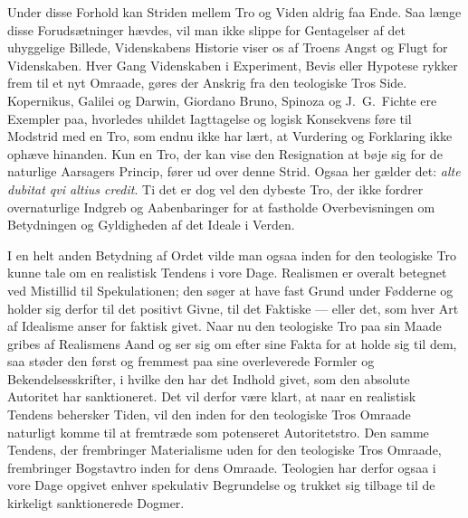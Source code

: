 \documentclass[12pt,a4paper]{article}
\begin{document}
Under disse Forhold kan Striden mellem Tro og Viden aldrig faa Ende.
Saa længe disse Forudsætninger hævdes, vil man ikke slippe for
Gentagelser af det uhyggelige Billede, Videnskabens Historie viser os af
Troens Angst og Flugt for Videnskaben. Hver Gang Videnskaben i
Experiment, Bevis eller Hypotese rykker frem til et nyt Omraade, gøres
der Anskrig fra den teologiske Tros Side. Kopernikus, Galilei og Darwin,
Giordano Bruno, Spinoza og J.\ G.\ Fichte ere Exempler paa, hvorledes
uhildet Iagttagelse og logisk Konsekvens føre til Modstrid med en Tro,
som endnu ikke har lært, at Vurdering og Forklaring ikke ophæve
hinanden. Kun en Tro, der kan vise den Resignation at bøje sig for de
naturlige Aarsagers Princip, fører ud over denne Strid. Ogsaa her
gælder det: \textit{alte dubitat qvi altius credit}. Ti det er dog vel
den dybeste Tro, der ikke fordrer overnaturlige Indgreb og Aabenbaringer
for at fastholde Overbevisningen om Betydningen og Gyldigheden af det
Ideale i Verden.

I en helt anden Betydning af Ordet vilde man ogsaa inden for den
teologiske Tro kunne tale om en realistisk Tendens i vore Dage.
Realismen er overalt betegnet ved Mistillid til Spekulationen; den søger
at have fast Grund under Fødderne og holder sig derfor til det positivt
Givne, til det Faktiske --- eller det, som hver Art af Idealisme anser
for faktisk givet. Naar nu den teologiske Tro paa sin Maade gribes af
Realismens Aand og ser sig om efter sine Fakta for at holde sig til
dem, saa støder den først og fremmest paa sine overleverede Formler og
Bekendelsesskrifter, i hvilke den har det Indhold givet, som den
absolute Autoritet har sanktioneret. Det vil derfor være klart, at naar
en realistisk Tendens behersker Tiden, vil den inden for den teologiske
Tros Omraade naturligt komme til at fremtræde som potenseret
Autoritetstro. Den samme Tendens, der frembringer Materialisme uden for
den teologiske Tros Omraade, frembringer Bogstavtro inden for dens
Omraade. Teologien har derfor ogsaa i vore Dage opgivet enhver spekulativ
Begrundelse og trukket sig tilbage til de kirkeligt sanktionerede Dogmer.
\end{document}
